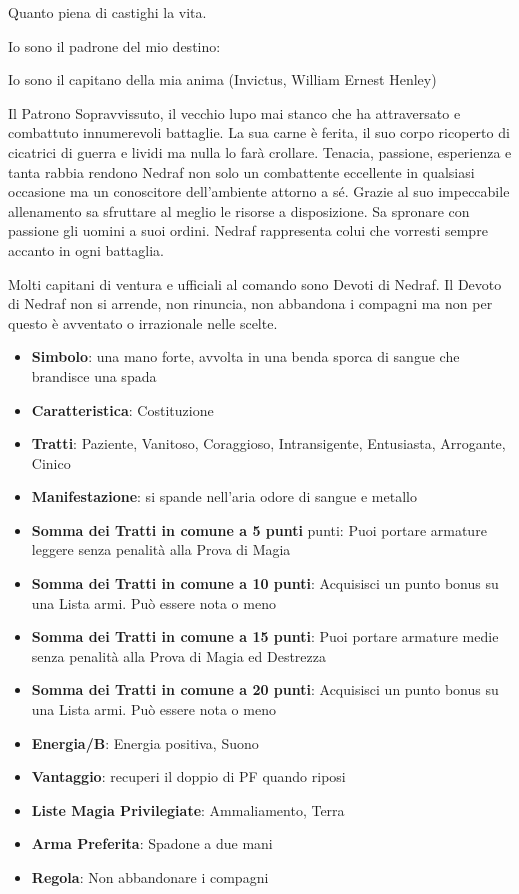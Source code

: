 \begin{multicols}{2}
\begin{enfasi}
{Quanto piena di castighi la vita.

Io sono il padrone del mio destino:

Io sono il capitano della mia anima (Invictus, William Ernest Henley)
}\end{enfasi}

Il Patrono Sopravvissuto, il vecchio lupo mai stanco che ha attraversato e combattuto innumerevoli battaglie. La sua carne è ferita, il suo corpo ricoperto di cicatrici di guerra e lividi ma nulla lo farà crollare. Tenacia, passione, esperienza e tanta rabbia rendono Nedraf non solo un combattente eccellente in qualsiasi occasione ma un conoscitore dell'ambiente attorno a sé. Grazie al suo impeccabile allenamento sa sfruttare al meglio le risorse a disposizione. Sa spronare con passione gli uomini a suoi ordini.
Nedraf rappresenta colui che vorresti sempre accanto in ogni battaglia.

Molti capitani di ventura e ufficiali al comando sono Devoti di Nedraf. Il Devoto di Nedraf non si arrende, non rinuncia, non abbandona i compagni ma non per questo è avventato o irrazionale nelle scelte.

\begin{itemize}[leftmargin=*] \setlength{\itemsep}{0pt}
\item \textbf{Simbolo}: una mano forte, avvolta in una benda sporca di sangue che brandisce una spada
\item \textbf{Caratteristica}: Costituzione
\item \textbf{Tratti}: Paziente, Vanitoso, Coraggioso, Intransigente, Entusiasta, Arrogante, Cinico
\item \textbf{Manifestazione}: si spande nell'aria odore di sangue e metallo
\item \textbf{Somma dei Tratti in comune a 5 punti} punti: Puoi portare armature leggere senza penalità alla Prova di Magia
\item \textbf{Somma dei Tratti in comune a 10 punti}: Acquisisci un punto bonus su una Lista armi. Può essere nota o meno
\item \textbf{Somma dei Tratti in comune a 15 punti}: Puoi portare armature medie senza penalità alla Prova di Magia ed Destrezza
\item \textbf{Somma dei Tratti in comune a 20 punti}: Acquisisci un punto bonus su una Lista armi. Può essere nota o meno
\item \textbf{Energia/B}: Energia positiva, Suono
\item \textbf{Vantaggio}: recuperi il doppio di PF quando riposi
\item \textbf{Liste Magia Privilegiate}: Ammaliamento, Terra
\item \textbf{Arma Preferita}: Spadone a due mani
\item \textbf{Regola}: Non abbandonare i compagni
\end{itemize}


\end{multicols}
